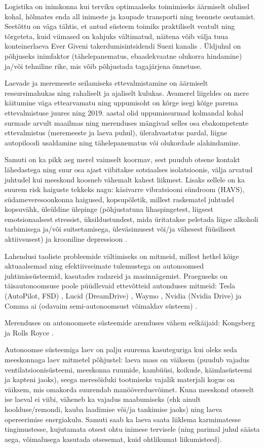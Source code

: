
Logistika on inimkonna kui terviku optimaalseks toimimiseks äärmiselt olulisel kohal, hõlmates enda all inimeste ja kaupade transporti ning teenuste osutamist. Seetõttu on väga tähtis, et antud süsteem toimiks praktiliselt veatult ning tõrgeteta, kuid viimased on kahjuks vältimatud, näitena võib välja tuua konteinerlaeva Ever Giveni takerdumisintsidendi Suezi kanalis \cite{ref1}. Üldjuhul on põhjuseks inimfaktor (tähelepanematus, ebaadekvaatne olukorra hindamine) ja/või tehniline rike, mis võib põhjustada tagajärjena õnnetuse.

Laevade ja meremeeste seilamiseks ettevalmistamine on äärmiselt ressursimahukas ning rahaliselt ja ajaliselt kulukas. Avamerel liigeldes on mere käitumine väga ettearvamatu ning uppumisoht on kõrge isegi kõige parema ettevalmistuse juures ning 2019. aastal olid uppumissurmad kolmandal kohal surmade arvult maailmas \cite{ref2} ning merenduses mängivad selles osa ebakompetente ettevalmistus (meremeeste ja laeva puhul), ülerahvastatus pardal, liigne autopiloodi usaldamine ning tähelepanematus või olukordade alahindamine.

Samuti on ka pikk aeg merel vaimselt koormav, sest puudub otsene kontakt lähedastega ning suur osa ajast viibitakse sotsiaalses isolatsioonis, välja arvatud juhtudel kui meeskond koosneb vähemalt kahest liikmest. Lisaks sellele on ka suurem risk haiguste tekkeks nagu: käsivarre vibratsiooni sündroom (HAVS), südameveresoonkonna haigused, kopsupõletik, millest raskematel juhtudel kopsuvähk, üleüldine ülepinge (põhjustatuna lihaspingetest, liigsest emotsionaalsest stressist, üksildustundest, mida üritatakse peletada liigse alkoholi tarbimisega ja/või suitsetamisega, üleväsimusest või/ja vähesest füüsilisest aktiivsusest) ja krooniline depressioon \cite{ref3}.

Lahendusi taoliste probleemide vältimiseks on mitmeid, millest hetkel kõige aktuaalsemad ning efektiivseimate tulemustega on autonoomsed juhtimissüsteemid, kasutades radareid ja masinnägemist. Praeguseks on täisautonoomsuse poole püüdlevaid ettevõtteid autonduses mitmeid: Tesla (AutoPilot, FSD) \cite{ref4}, Lucid (DreamDrive) \cite{ref5}, Waymo \cite{ref6}, Nvidia (Nvidia Drive) \cite{ref7} ja Comma ai (odavaim semi-autonoomsust võimaldav süsteem) \cite{ref8}.

Merenduses on autonoomsete süsteemide arenduses vähem eelkäijaid: Kongsberg \cite{ref9} ja Rolls Royce \cite{ref10}.

Autonoomse süsteemiga laev on palju suurema kasuteguriga kui oleks seda meeskonnaga laev mitmetel põhjustel: laeva mass on väiksem (puudub vajadus ventilatsioonisüsteemi, meeskonna ruumide, kambüüsi, koikude, käimlasüsteemi ja kapteni jaoks), seega meresõiduki tootmiseks vajalik materjali kogus on väiksem, mis omakorda suurendab manööverdusvõimet. Kuna meeskond otseselt ise laeval ei viibi, väheneb ka vajadus maabumiseks (ehk ainult hoolduse/remondi, kauba laadimise või/ja tankimise jaoks) ning laeva opereerimise energiakulu. Samuti saab ka laeva saata liiklema karmimatesse tingimustesse, kujutamata otsest ohtu inimese tervisele (ning parimal juhul säästa aega, võimalusega kasutada otsesemat, kuid ohtlikumat liikumisteed).

